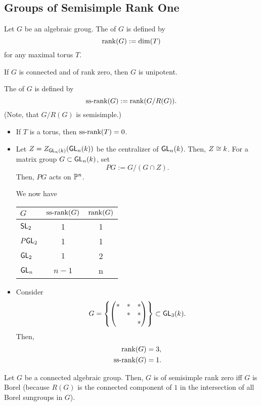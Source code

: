 \subsection{Groups of Semisimple Rank One}

\begin{definition}
	Let $G$ be an algebraic groug. The  of $G$ is defined by
	\[ \rank (G) := \dim(T) \]
	for any maximal torus $T$.
\end{definition}
\begin{remark}
	If $G$ is connected and of rank zero, then $G$ is unipotent.
\end{remark}
\begin{definition}
	The  of $G$ is defined by
	\[ \ssr (G ):= \rank ( G / R(G)). \]
	(Note, that $G/R(G)$ is semisimple.)
\end{definition}
\begin{example}
	\begin{itemize}
		\item If $T$ is a torus, then $\ssr(T) = 0$.
		\item Let $Z = Z_{\GL_n(k)}(\GL_n(k)) $ be the centralizer of $\GL_n(k)$. Then, $Z \isom{} k$. For a matrix group $G \subset \GL_n(k)$, set
		\[ PG := G / (G \cap Z). \]
		Then, $PG$ acts on $\P^n$.
		
		We now have
		\begin{center}
			\begin{tabular}{l|c|c}
				$G$ & $\ssr(G)$ & $ \rank(G)$\\\hline
				$\SL_2$ & 1 & 1\\
				$P\GL_2$ & 1 & 1\\
				$\GL_2$ & $1$ & 2\\
				$\GL_n$ & $n-1$ & n
			\end{tabular}
		\end{center}
	\item Consider
	\[ G = \curv{\mat{* & * & * \\* & * & * \\ & & * }} \subset \GL_3(k). \]
	Then,
	\begin{align*}
	\rank(G) &= 3,\\
	\ssr (G) &= 1.
	\end{align*}
	\end{itemize}
\end{example}

\begin{remark}
	Let $G$ be a connected algebraic group. Then, $G$ is of semisimple rank zero iff $G$ is Borel (because $R(G)$ is the connected component of $1$ in the intersection of all Borel sungroups in $G$).
\end{remark}

